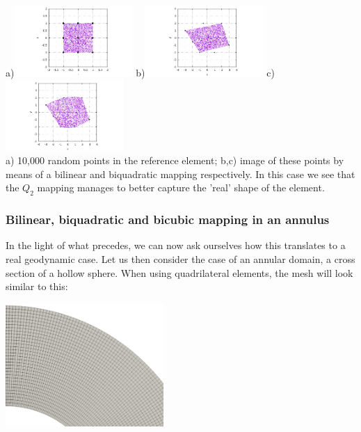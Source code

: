 \begin{center}
a)\includegraphics[width=4.5cm]{images/mappings/biquadratic2/rs.pdf}
b)\includegraphics[width=4.5cm]{images/mappings/biquadratic2/xyQ1.pdf}
c)\includegraphics[width=4.5cm]{images/mappings/biquadratic2/xyQ2.pdf}\\
{\captionfont a) 10,000 random points in the reference element; b,c) image of these points
by means of a bilinear and biquadratic mapping respectively. In this case we see that 
the $Q_2$ mapping manages to better capture the 'real' shape of the element.}
\end{center}

\subsubsection{Bilinear, biquadratic and bicubic mapping in an annulus }

In the light of what precedes, we can now ask ourselves how this translates to 
a real geodynamic case. Let us then consider the case of an annular domain, 
a cross section of a hollow sphere. 
When using quadrilateral elements, the mesh will look similar to this:

\begin{center}
\includegraphics[width=6cm]{images/mappings/curved/annulus_mesh}
\end{center}

